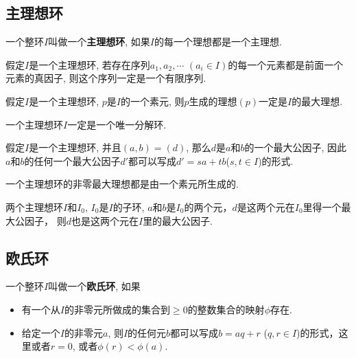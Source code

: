\subsection{主理想环} %

\begin{Definition}[主理想环]
一个整环$I$叫做一个\textbf{主理想环}, 如果$I$的每一个理想都是一个主理想.
\end{Definition}

\begin{Lemma}
假定$I$是一个主理想环, 若存在序列$a_1, a_2, \cdots$ $(a_i \in I)$的每一个元素都是前面一个元素的真因子, 则这个序列一定是一个有限序列.
\end{Lemma}

\begin{Lemma}[!!]
假定$I$是一个主理想环, $p$是$I$的一个素元, 则$p$生成的理想$(p)$一定是$I$的最大理想.
\end{Lemma}

\begin{Theorem}
一个主理想环$I$一定是一个唯一分解环.
\end{Theorem}

\begin{Proposition}
假定$I$是一个主理想环, 并且$(a, b) = (d)$, 那么$d$是$a$和$b$的一个最大公因子, 因此$a$和$b$的任何一个最大公因子$d'$都可以写成$d' = sa +tb$\;($s, t \in I$)的形式.
\end{Proposition}

\begin{Proposition}
一个主理想环的非零最大理想都是由一个素元所生成的.
\end{Proposition}

\begin{Proposition}
两个主理想环$I$和$I_0$, $I_0$是$I$的子环, $a$和$b$是$I_0$的两个元，$d$是这两个元在$I_0$里得一个最大公因子， 则$d$也是这两个元在$I$里的最大公因子.
\end{Proposition}

\subsection{欧氏环} %

\begin{Definition}[欧氏环]
一个整环$I$叫做一个\textbf{欧氏环}, 如果
\begin{itemize}
	\item 有一个从$I$的非零元所做成的集合到$\ge 0$的整数集合的映射$\phi$存在.
	\item 给定一个$I$的非零元$a$, 则$I$的任何元$b$都可以写成$b = aq +r$ ($q, r \in I$)的形式，这里或者$r = 0$, 或者$\phi(r) < \phi(a)$.
\end{itemize}
\end{Definition}

